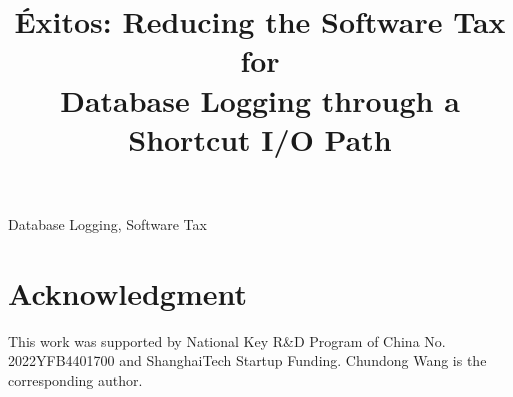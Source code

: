 \documentclass[conference]{IEEEtran}
\newcommand{\odes}{\'Exitos\xspace}
\begin{document}
\title{\odes: Reducing the Software Tax for\\ Database Logging through a Shortcut I/O Path}

\author{

}

\maketitle
 


%


\begin{IEEEkeywords}
	Database Logging, Software Tax %
\end{IEEEkeywords}

\iffalse

\else
 


%
%


%
% 

\fi

\section*{Acknowledgment}


This work was supported by National Key R\&D Program of China No. 2022YFB4401700 and 
ShanghaiTech Startup Funding. Chundong Wang is the corresponding author.



\end{document}
